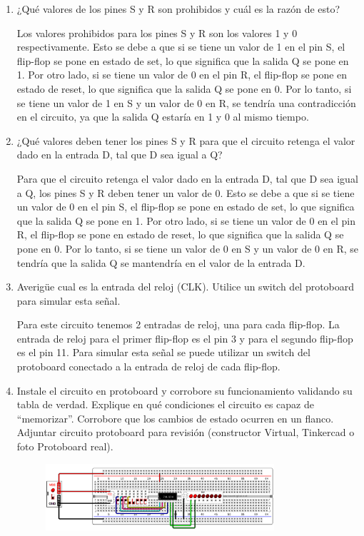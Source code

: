 \documentclass{templateNote}
\begin{document}
\begin{enumerate}
    \item ¿Qué valores de los pines S y R son prohibidos y cuál es la razón de esto?
    
    Los valores prohibidos para los pines S y R son los valores 1 y 0 respectivamente. Esto se debe a que si se tiene un valor de 1 en el pin S, el flip-flop se pone en estado de set, lo que significa que la salida Q se pone en 1. Por otro lado, si se tiene un valor de 0 en el pin R, el flip-flop se pone en estado de reset, lo que significa que la salida Q se pone en 0. Por lo tanto, si se tiene un valor de 1 en S y un valor de 0 en R, se tendría una contradicción en el circuito, ya que la salida Q estaría en 1 y 0 al mismo tiempo.

    \item ¿Qué valores deben tener los pines S y R para que el circuito retenga el valor dado en la entrada D, tal que D sea igual a Q?
    
    Para que el circuito retenga el valor dado en la entrada D, tal que D sea igual a Q, los pines S y R deben tener un valor de 0. Esto se debe a que si se tiene un valor de 0 en el pin S, el flip-flop se pone en estado de set, lo que significa que la salida Q se pone en 1. Por otro lado, si se tiene un valor de 0 en el pin R, el flip-flop se pone en estado de reset, lo que significa que la salida Q se pone en 0. Por lo tanto, si se tiene un valor de 0 en S y un valor de 0 en R, se tendría que la salida Q se mantendría en el valor de la entrada D.
    
    \item Averigüe cual es la entrada del reloj (CLK). Utilice un switch del protoboard para simular esta señal.

    Para este circuito tenemos 2 entradas de reloj, una para cada flip-flop. La entrada de reloj para el primer flip-flop es el pin 3 y para el segundo flip-flop es el pin 11. Para simular esta señal se puede utilizar un switch del protoboard conectado a la entrada de reloj de cada flip-flop.
    
    \item Instale el circuito en protoboard y corrobore su funcionamiento validando su tabla de verdad. Explique en qué condiciones el circuito es capaz de “memorizar”. Corrobore que los cambios de estado ocurren en un flanco. Adjuntar circuito protoboard para revisión (constructor Virtual, Tinkercad o foto Protoboard real).
    
    \begin{figure}[H]
        \centering
        \includegraphics[width=0.8\textwidth]{img/circuito.png}        
    \end{figure}


\end{enumerate}
\end{document}
